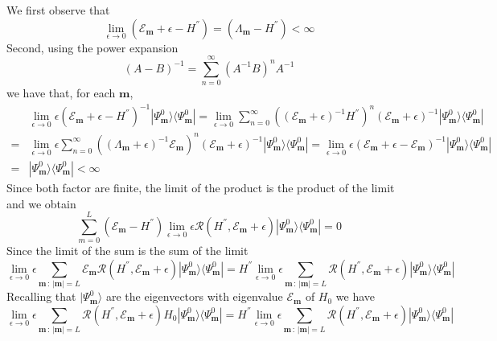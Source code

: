 \documentclass[10pt]{article}
\numberwithin{equation}{section}
\numberwithin{equation}{subsection}
\begin{document}
We first observe that
\begin{equation}
	\lim_{\epsilon\to 0}\left(\mathcal{E}_{\bm{m}}+\epsilon-H^{''}\right)=\left(\Lambda_{\bm{m}}-H^{''}\right)<\infty
\end{equation}
Second, using the power expansion
\begin{equation}\label{veryUsefulSeries}
	(A-B)^{-1}=\sum_{n=0}^{\infty}(A^{-1}B)^{n}A^{-1}
\end{equation}
we have that, for each $\bm{m}$, 
\begin{equation}
	\begin{split}
		&\lim_{\epsilon\to 0}\epsilon\left(\mathcal{E}_{\bm{m}}+\epsilon-H^{''}\right)^{-1}|\Psi_{\bm{m}}^{0}\rangle\langle\Psi_{\bm{m}}^{0}|=\lim_{\epsilon\to 0}\sum_{n=0}^{\infty}\left((\mathcal{E}_{\bm{m}}+\epsilon)^{-1}H^{''}\right)^{n}(\mathcal{E}_{\bm{m}}+\epsilon)^{-1}|\Psi_{\bm{m}}^{0}\rangle\langle\Psi_{\bm{m}}^{0}|
		\\=&
		\lim_{\epsilon\to 0}\epsilon\sum_{n=0}^{\infty}\left((\Lambda_{\bm{m}}+\epsilon)^{-1}\mathcal{E}_{\bm{m}}\right)^{n}(\mathcal{E}_{\bm{m}}+\epsilon)^{-1}|\Psi_{\bm{m}}^{0}\rangle\langle\Psi_{\bm{m}}^{0}|=\lim_{\epsilon\to 0}\epsilon\left(\mathcal{E}_{\bm{m}}+\epsilon-\mathcal{E}_{\bm{m}}\right)^{-1}|\Psi_{\bm{m}}^{0}\rangle\langle\Psi_{\bm{m}}^{0}|\\=&|\Psi_{\bm{m}}^{0}\rangle\langle\Psi_{\bm{m}}^{0}|<\infty
	\end{split}
\end{equation}
Since both factor are finite, the limit of the product is the product of the limit and we obtain
\begin{equation}
	\sum_{m=0}^{L}  (\mathcal{E}_{\bm{m}}-H^{''})\lim_{\epsilon\to 0}\epsilon \mathcal{R}(H^{''},\mathcal{E}_{\bm{m}}+\epsilon)|\Psi_{\bm{m}}^{0}\rangle \langle \Psi_{\bm{m}}^{0}|=0
\end{equation}
Since the limit of the sum is the sum of the limit   
\begin{equation}
	\lim_{\epsilon\to 0}\epsilon\sum_{\bm{m}\,:\, |\bm{m}|=L}  \mathcal{E}_{\bm{m}}\mathcal{R}(H^{''},\mathcal{E}_{\bm{m}}+\epsilon)|\Psi_{\bm{m}}^{0}\rangle \langle \Psi_{\bm{m}}^{0}|= H^{''}\lim_{\epsilon\to 0}\epsilon\sum_{\bm{m}\,:\, |\bm{m}|=L}  \mathcal{R}(H^{''},\mathcal{E}_{\bm{m}}+\epsilon)|\Psi_{\bm{m}}^{0}\rangle \langle \Psi_{\bm{m}}^{0}|
\end{equation}
Recalling that $|\Psi_{\bm{m}}^{0}\rangle$ are the eigenvectors with eigenvalue $\mathcal{E}_{\bm{m}}$ of $H_{0}$ we have 
\begin{equation}
	\lim_{\epsilon\to 0}\epsilon\sum_{\bm{m}\,:\,|\bm{m}|=L}  \mathcal{R}(H^{''},\mathcal{E}_{\bm{m}}+\epsilon)H_{0}|\Psi_{\bm{m}}^{0}\rangle \langle \Psi_{\bm{m}}^{0}|= H^{''}\lim_{\epsilon\to 0}\epsilon\sum_{\bm{m}\,:\,|\bm{m}|=L}  \mathcal{R}(H^{''},\mathcal{E}_{\bm{m}}+\epsilon)|\Psi_{\bm{m}}^{0}\rangle \langle \Psi_{\bm{m}}^{0}|
\end{equation}
\end{document}
